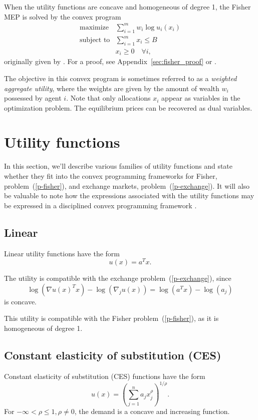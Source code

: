 \documentclass[12pt]{article}
\begin{document}
When the utility functions are concave and homogeneous of degree 1,
the Fisher MEP is solved by the convex program
\begin{equation}
\label{p-fisher}
\begin{array}{ll}
\mbox{maximize} & \sum_{i=1}^m w_i \log u_i(x_i) \\
\mbox{subject to} & \sum_{i=1}^m x_i \leq B\\
& x_i \geq 0\quad \forall i,
\end{array}
\end{equation}
originally given by \cite{eisenberg1959consensus, gale1960theory, eisenberg1961aggregation}.
For a proof, see Appendix~\ref{sec:fisher_proof} or \cite[\S~6.2]{nisan2007algorithmic}.

The objective in this convex program is sometimes referred to as a \emph{weighted aggregate utility}, where the weights are given by the amount
of wealth $w_i$ possessed by agent $i$.
Note that only allocations $x_i$ appear as variables in the optimization
problem.
The equilibrium prices can be recovered as dual variables.

\section{Utility functions}
\label{sec:util_funcs}

In this section, we'll describe various families of utility functions
and state whether they fit into the convex programming frameworks
for Fisher, problem~(\ref{p-fisher}), and exchange markets, problem~(\ref{p-exchange}). 
It will also
be valuable to note how the expressions associated
with the utility functions may be expressed in a disciplined
convex programming framework \cite{grant2006disciplined}.

\subsection{Linear}

Linear utility functions have the form
\[
u(x) = a^T x.
\]

The utility is compatible with the exchange problem~(\ref{p-exchange}),
since
\[
\log(\nabla u(x)^T x) - \log(\nabla_j u(x))  = \log(a^T x) - \log(a_j)
\]
is concave.

This utility is compatible with the Fisher problem~(\ref{p-fisher}), as it is homogeneous of degree 1.


\subsection{Constant elasticity of substitution (CES)}
Constant elasticity of substitution (CES) functions have the form
\[
u(x) = \left(\sum_{j=1}^n a_j x_j^\rho \right)^{1/\rho}.
\]
For $-\infty < \rho \leq 1, \rho \neq 0$, the demand is a concave and
increasing function.
\end{document}
